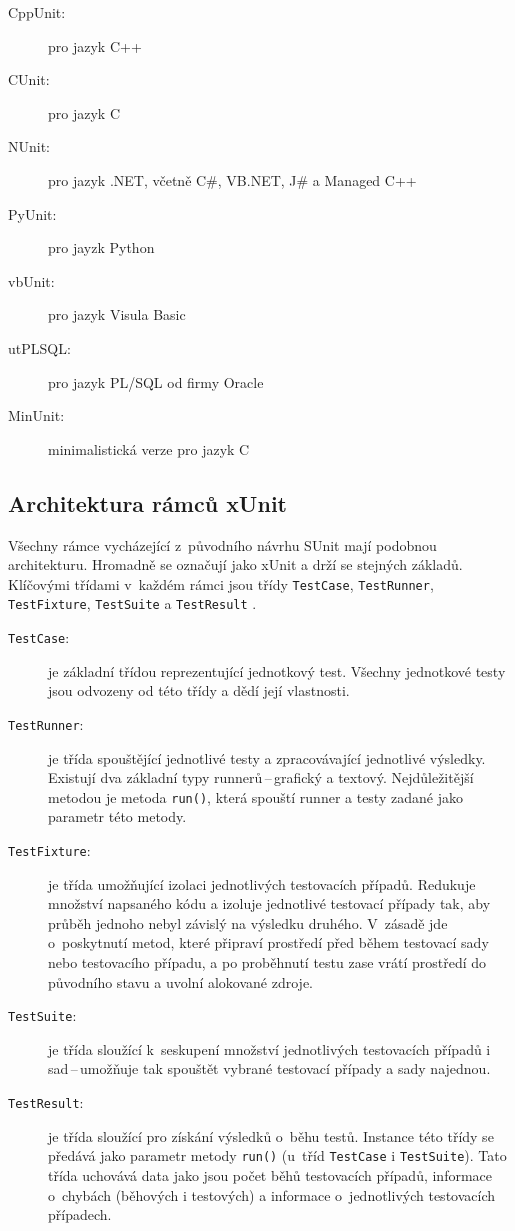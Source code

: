   \begin{description}
   \item[CppUnit:] pro jazyk C++
   \item[CUnit:] pro jazyk C
   \item[NUnit:] pro jazyk .NET, včetně C\#, VB.NET, J\# a Managed C++
   \item[PyUnit:] pro jayzk Python
   \item[vbUnit:] pro jazyk Visula Basic
   \item[utPLSQL:] pro jazyk PL/SQL od firmy Oracle
   \item[MinUnit:] minimalistická verze pro jazyk C
  \end{description}


    \subsection{Architektura rámců xUnit}
    Všechny rámce vycházející z~původního návrhu SUnit mají podobnou architekturu. Hromadně se označují jako xUnit a drží se stejných základů. Klíčovými třídami v~každém rámci jsou třídy \texttt{TestCase}, \texttt{TestRunner}, \texttt{TestFixture}, \texttt{TestSuite} a \texttt{TestResult} \cite{UnitTestFrameworks}.

    \begin{description}
      \item[\texttt{TestCase}:] je základní třídou reprezentující jednotkový test. Všechny jednotkové testy jsou odvozeny od této třídy a dědí její vlastnosti.
      \item[\texttt{TestRunner}:] je třída spouštějící jednotlivé testy a zpracovávající jednotlivé výsledky. Existují dva základní typy runnerů\,--\,grafický a textový. Nejdůležitější metodou je metoda \texttt{run()}, která spouští runner a testy zadané jako parametr této metody.
      \item[\texttt{TestFixture}:] je třída umožňující izolaci jednotlivých testovacích případů. Redukuje množství napsaného kódu a izoluje jednotlivé testovací případy tak, aby průběh jednoho nebyl závislý na výsledku druhého. V~zásadě jde o~poskytnutí metod, které připraví prostředí před během testovací sady nebo testovacího případu, a po proběhnutí testu zase vrátí prostředí do původního stavu a uvolní alokované zdroje.
      \item[\texttt{TestSuite}:] je třída sloužící k~seskupení množství jednotlivých testovacích případů i sad\,--\,umožňuje tak spouštět vybrané testovací případy a sady najednou.
      \item[\texttt{TestResult}:] je třída sloužící pro získání výsledků o~běhu testů. Instance této třídy se předává jako parametr metody \texttt{run()} (u~tříd \texttt{TestCase} i \texttt{TestSuite}). Tato třída uchovává data jako jsou počet běhů testovacích případů, informace o~chybách (běhových i testových) a informace o~jednotlivých testovacích případech.
    \end{description}


